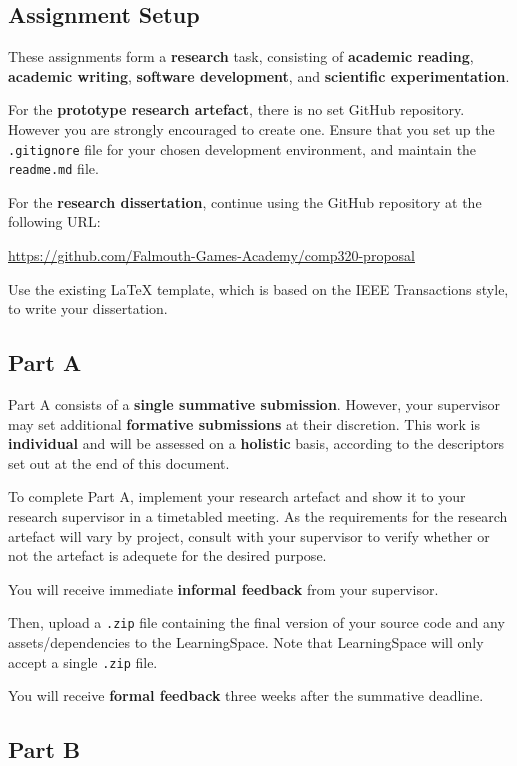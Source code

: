 \documentclass{../fal_assignment}
\begin{document}
\subsection*{Assignment Setup}

These assignments form a \textbf{research} task, consisting of \textbf{academic reading}, \textbf{academic writing},
\textbf{software development}, and \textbf{scientific experimentation}.

For the \textbf{prototype research artefact}, there is no set GitHub repository.
However you are strongly encouraged to create one.
Ensure that you set up the \texttt{.gitignore} file for your chosen development environment,
and maintain the \texttt{readme.md} file.

For the \textbf{research dissertation}, continue using the GitHub repository at the following URL:

\indent \url{https://github.com/Falmouth-Games-Academy/comp320-proposal}

Use the existing LaTeX template, which is based on the IEEE Transactions style,
to write your dissertation.

\subsection*{Part A}

Part A consists of a \textbf{single summative submission}.
However, your supervisor may set additional \textbf{formative submissions} at their discretion.
This work is \textbf{individual} and will be assessed on a \textbf{holistic} basis, according to the descriptors set out at the end of this document.

To complete Part A, implement your research artefact and show it to your research supervisor in a timetabled meeting. As
the requirements for the research artefact will vary by project, consult with your supervisor to verify whether or not the
artefact is adequete for the desired purpose.

You will receive immediate \textbf{informal feedback} from your supervisor.

Then, upload a \texttt{.zip} file containing the final version of your source code and any assets/dependencies to the LearningSpace.
Note that LearningSpace will only accept a single \texttt{.zip} file.

You will receive \textbf{formal feedback} three weeks after the summative deadline.

\subsection*{Part B}
\end{document}
